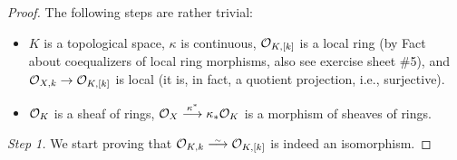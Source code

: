 \documentclass[a4paper,parskip=half,numbers=enddot, DIV=12]{scrreprt}
\begin{document}
\begin{proof}
    The following steps are rather trivial:
    \begin{itemize}
      \item 
        $K$ is a topological space, $\kappa$ is continuous, $\mathcal{O}_{K,[k]}$ is a local ring (by Fact~ about coequalizers of local ring morphisms, also see exercise sheet \#5), and $\Oo_{X,k} \morphism \Oo_{K,[k]}$ is local (it is, in fact, a quotient projection, i.e., surjective).
      \item 
        $\mathcal{O}_K$ is a sheaf of rings, $\Oo_X \morphism[\kappa^*] \kappa_*\Oo_K$ is a morphism of sheaves of rings.
    \end{itemize} 
    \emph{Step 1.} We start proving that $\Oo_{K,k}\isomorphism\Oo_{K,[k]}$ is indeed an isomorphism. 
    

\end{proof}
\end{document}
